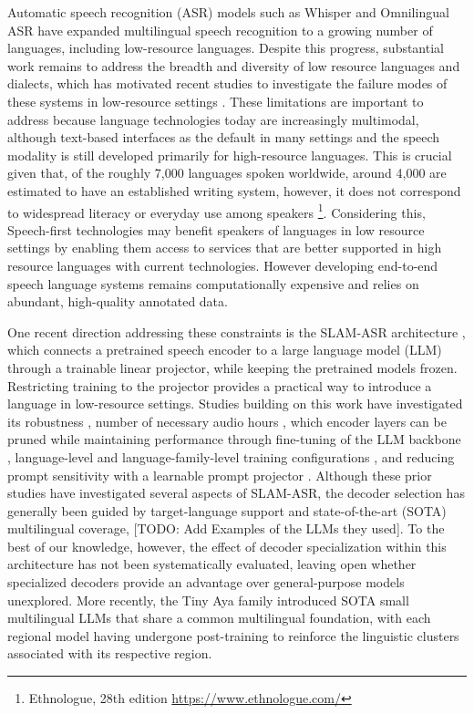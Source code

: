 \documentclass[11pt]{article}
\begin{document}
Automatic speech recognition (ASR) models such as Whisper \citep{radfordRobustSpeechRecognition} and Omnilingual ASR\citep{teamOmnilingualASROpenSource2025} have expanded multilingual speech recognition to a growing number of languages, including low-resource languages. Despite this progress, substantial work remains to address the breadth and diversity of low resource languages and dialects, which has motivated recent studies to investigate the failure modes of these systems in low-resource settings \citep{imamAutomaticSpeechRecognition, kyslyiBuildingASRResources, kumarOvercomingDecoderInconsistencies2026, bharathiFindingsTamilDialect, azisDevelopmentLowResourceAutomatic2026}.  These limitations are important to address because language technologies today are increasingly multimodal, although text-based interfaces as the default in many settings and the speech modality is still developed primarily for high-resource languages. This is crucial given that, of the roughly 7,000 languages spoken worldwide, around 4,000 are estimated to
have an established writing system, however, it does not correspond to widespread literacy or everyday use among speakers \footnote{Ethnologue, 28th edition \url{https://www.ethnologue.com/}}. Considering this, Speech-first technologies may benefit speakers of languages in low resource settings by enabling them access to services that are better supported in high resource languages with current technologies. However developing end-to-end speech language systems remains computationally expensive and relies on abundant, high-quality annotated data. 

One recent direction addressing these constraints is the SLAM-ASR architecture \citep{maEmbarrassinglySimpleApproach2024}, which connects a pretrained speech encoder to a large language model (LLM) through a trainable linear projector, while keeping the pretrained models frozen.  Restricting training to the projector provides a practical way to introduce a language in low-resource settings. Studies building on this work have investigated its robustness \citep{kumarPerformanceEvaluationSLAMASR2025}, number of necessary audio hours \citep{fongSpeechLLMsLowResource2025}, which encoder layers can be pruned while maintaining performance through fine-tuning of the LLM backbone \citep{kolluriRoleEncoderDepth2026}, language-level and language-family-level training configurations \citep{zhangLanguageFamilyMatters2026}, and reducing prompt sensitivity with a learnable prompt projector \citep{burdissoReducingPromptSensitivity2026}. Although these prior studies have investigated several aspects of SLAM-ASR, the decoder selection has generally been guided by target-language support and state-of-the-art (SOTA) multilingual coverage, [TODO: Add Examples of the LLMs they used]. To the best of our knowledge, however, the effect of decoder specialization within this architecture has not been systematically evaluated, leaving open whether specialized decoders provide an advantage over general-purpose models unexplored. More recently, the Tiny Aya family\citep{salamancaTinyAyaBridging2026} introduced SOTA small multilingual LLMs that share a common multilingual foundation, with each regional model having undergone post-training to reinforce the linguistic clusters associated with its respective region. 
\end{document}
